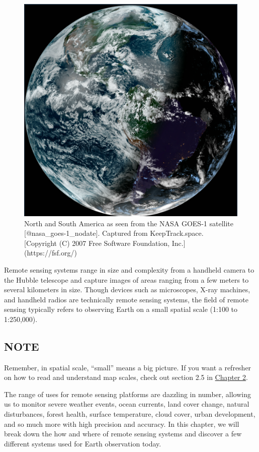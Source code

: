 \documentclass[
]{book}
\begin{document}
\begin{figure}
\includegraphics[width=0.9\linewidth]{images/12-GOES_1_earth} \caption{North and South America as seen from the NASA GOES-1 satellite [@nasa_goes-1_nodate]. Captured from KeepTrack.space. [Copyright (C) 2007 Free Software Foundation, Inc.](https://fsf.org/)}\label{fig:12-GOES-1-earth}
\end{figure}

Remote sensing systems range in size and complexity from a handheld camera to the Hubble telescope and capture images of areas ranging from a few meters to several kilometers in size. Though devices such as microscopes, X-ray machines, and handheld radios are technically remote sensing systems, the field of remote sensing typically refers to observing Earth on a small spatial scale (1:100 to 1:250,000).

\hypertarget{note}{%
\subsection*{NOTE}\label{note}}

Remember, in spatial scale, ``small'' means a big picture. If you want a refresher on how to read and understand map scales, check out section 2.5 in \href{https://ubc-geomatics-textbook.github.io/geomatics-textbook/mapping-data.html}{Chapter 2}.

The range of uses for remote sensing platforms are dazzling in number, allowing us to monitor severe weather events, ocean currents, land cover change, natural disturbances, forest health, surface temperature, cloud cover, urban development, and so much more with high precision and accuracy. In this chapter, we will break down the how and where of remote sensing systems and discover a few different systems used for Earth observation today.
\end{document}

